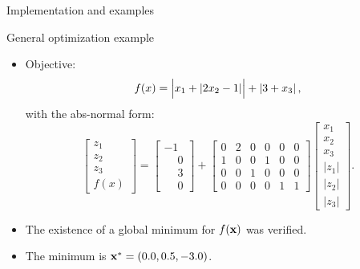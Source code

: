 \documentclass[10pt]{beamer}
\begin{document}
\begin{frame}{Implementation and examples}
{  \begin{block}{General optimization example}
    \begin{itemize}
    \item Objective: 
    \[
    f(x) = \Bigl|x_1+ \left|2x_2-1\right| \Bigr|+ \left|3 + x_3\right|,
    \] with the abs-normal form:
    \[
    \begin{bmatrix}
      z_1 \\ z_2 \\ z_3 \\ f(x)
    \end{bmatrix}
    =
    \begin{bmatrix}
      -1 \\ \phantom{-}0 \\ \phantom{-}3 \\ \phantom{-}0
    \end{bmatrix}
    +
    \begin{bmatrix}
      0 & 2 & 0 & 0 & 0 & 0 \\
      1 & 0 & 0 & 1 & 0 & 0\\
      0 & 0 & 1 & 0 & 0 & 0 \\
      0 & 0 & 0 & 0 & 1 & 1
    \end{bmatrix}
    \begin{bmatrix}
      x_1 \\ x_2 \\ x_3 \\ |z_1| \\ |z_2| \\ |z_3|
    \end{bmatrix}.
    \]
    \vspace{-5mm}
    \item The existence of a global minimum for $f(\mathbf{x})$ was verified.
    \item The minimum is $\mathbf{x}^\ast=(0.0, 0.5, -3.0)$.
    \end{itemize}
  \end{block}
}
\end{frame}
\end{document}
